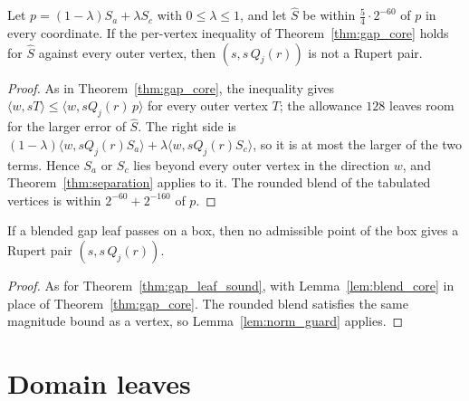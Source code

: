 \begin{lemma}
\label{lem:blend_core}
\leanok
{}
Let $p = (1 - \lambda) S_a + \lambda S_c$ with $0 \le \lambda \le 1$, and let $\hat S$ be
within $\tfrac54 \cdot 2^{-60}$ of $p$ in every coordinate. If the per-vertex inequality of
Theorem~\ref{thm:gap_core} holds for $\hat S$ against every outer vertex, then $(s, s\,Q_j(r))$
is not a Rupert pair.
\end{lemma}
\begin{proof}
\leanok
As in Theorem~\ref{thm:gap_core}, the inequality gives
$\langle w, s T\rangle \le \langle w, s Q_j(r)\, p\rangle$ for every outer vertex $T$; the
allowance $128$ leaves room for the larger error of $\hat S$. The right side is
$(1 - \lambda) \langle w, s Q_j(r) S_a\rangle + \lambda \langle w, s Q_j(r) S_c\rangle$, so it
is at most the larger of the two terms. Hence $S_a$ or $S_c$ lies beyond every outer vertex
in the direction $w$, and Theorem~\ref{thm:separation} applies to it. The rounded blend of the
tabulated vertices is within $2^{-60} + 2^{-160}$ of $p$.
\end{proof}

\begin{theorem}
\label{thm:blend_leaf_sound}
\leanok
{}
If a blended gap leaf passes on a box, then no admissible point of the box gives a Rupert
pair $(s, s\, Q_j(r))$.
\end{theorem}
\begin{proof}
\leanok
As for Theorem~\ref{thm:gap_leaf_sound}, with Lemma~\ref{lem:blend_core} in place of
Theorem~\ref{thm:gap_core}. The rounded blend satisfies the same magnitude bound as a
vertex, so Lemma~\ref{lem:norm_guard} applies.
\end{proof}

\section{Domain leaves}

